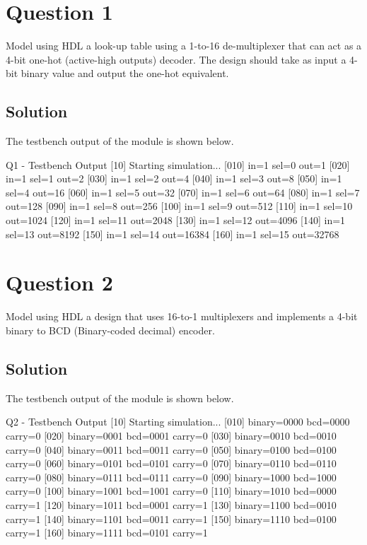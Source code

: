 \documentclass[../main.tex]{subfiles}
\begin{document}
\section{Question 1}

Model using HDL a look-up table using a 1-to-16 de-multiplexer that can act as a 4-bit one-hot (active-high outputs) decoder. The design should take as input a 4-bit binary value and output the one-hot equivalent.

\subsection*{Solution}

The testbench output of the module is shown below.

\begin{mintedterminal}{Q1 - Testbench Output}
[10] Starting simulation...
[010] in=1 sel=0 out=1
[020] in=1 sel=1 out=2
[030] in=1 sel=2 out=4
[040] in=1 sel=3 out=8
[050] in=1 sel=4 out=16
[060] in=1 sel=5 out=32
[070] in=1 sel=6 out=64
[080] in=1 sel=7 out=128
[090] in=1 sel=8 out=256
[100] in=1 sel=9 out=512
[110] in=1 sel=10 out=1024
[120] in=1 sel=11 out=2048
[130] in=1 sel=12 out=4096
[140] in=1 sel=13 out=8192
[150] in=1 sel=14 out=16384
[160] in=1 sel=15 out=32768
\end{mintedterminal}

\newpage

\section{Question 2}

Model using HDL a design that uses 16-to-1 multiplexers and implements a 4-bit binary to BCD (Binary-coded decimal) encoder.

\subsection*{Solution}

The testbench output of the module is shown below.

\begin{mintedterminal}{Q2 - Testbench Output}
[10] Starting simulation...
[010] binary=0000 bcd=0000 carry=0
[020] binary=0001 bcd=0001 carry=0
[030] binary=0010 bcd=0010 carry=0
[040] binary=0011 bcd=0011 carry=0
[050] binary=0100 bcd=0100 carry=0
[060] binary=0101 bcd=0101 carry=0
[070] binary=0110 bcd=0110 carry=0
[080] binary=0111 bcd=0111 carry=0
[090] binary=1000 bcd=1000 carry=0
[100] binary=1001 bcd=1001 carry=0
[110] binary=1010 bcd=0000 carry=1
[120] binary=1011 bcd=0001 carry=1
[130] binary=1100 bcd=0010 carry=1
[140] binary=1101 bcd=0011 carry=1
[150] binary=1110 bcd=0100 carry=1
[160] binary=1111 bcd=0101 carry=1
\end{mintedterminal}
\end{document}

